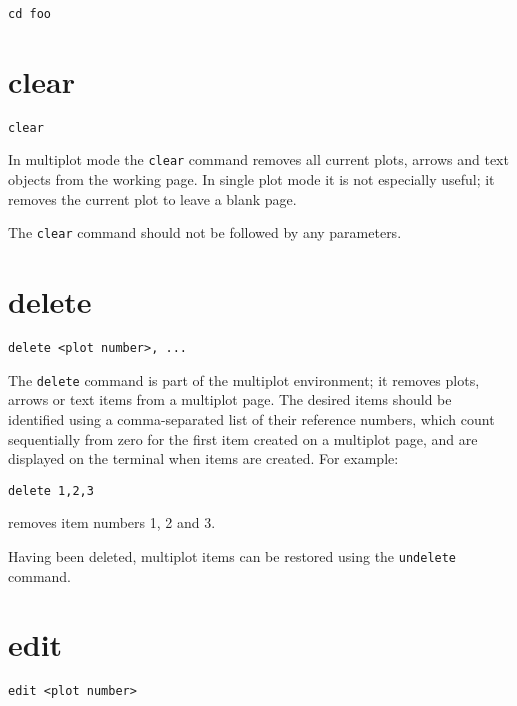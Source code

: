 \documentclass[a4paper,onecolumn,11pt]{book}
\begin{document}
\begin{verbatim}
cd foo
\end{verbatim}


\section{clear}

\begin{verbatim}
clear
\end{verbatim}

In multiplot mode the {\tt clear} command removes all current plots, arrows and
text objects from the working page. In single plot mode it is not especially
useful; it removes the current plot to leave a blank page.

The {\tt clear} command should not be followed by any parameters.


\section{delete}

\begin{verbatim}
delete <plot number>, ...
\end{verbatim}

The {\tt delete} command is part of the multiplot environment; it removes
plots, arrows or text items from a multiplot page. The desired items should be
identified using a comma-separated list of their reference numbers, which count
sequentially from zero for the first item created on a multiplot page, and are
displayed on the terminal when items are created.  For example:

\begin{verbatim}
delete 1,2,3
\end{verbatim}

\noindent removes item numbers 1, 2 and 3.

Having been deleted, multiplot items can be restored using the {\tt undelete}
command.

\section{edit}

\begin{verbatim}
edit <plot number>
\end{verbatim}
\end{document}
